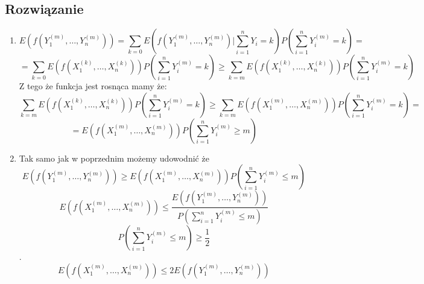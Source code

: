 \subsection*{Rozwiązanie}
\begin{enumerate}[label=(\roman*)]
	\item
	      \[E\left(f\left(Y_{1}^{(m)},\dots,Y_{n}^{(m)}\right)\right) = \sum_{k=0}E\left(f\left(Y_{1}^{(m)},\dots,Y_{n}^{(m)}\right)|\sum_{i=1}^{n}Y_{i}=k\right)P\left(\sum_{i=1}^{n}Y_{i}^{(m)}=k\right) =\]
	      \[= \sum_{k=0}E\left(f\left(X_{1}^{(k)},\dots,X_{n}^{(k)}\right)\right)P\left(\sum_{i=1}^{n}Y_{i}^{(m)}=k\right) \geqslant \sum_{k=m}E\left(f\left(X_{1}^{(k)},\dots,X_{n}^{(k)}\right)\right)P\left(\sum_{i=1}^{n}Y_{i}^{(m)}=k\right)\]
	      Z tego że funkcja jest rosnąca mamy że:
	      \[\sum_{k=m}E\left(f\left(X_{1}^{(k)},\dots,X_{n}^{(k)}\right)\right)P\left(\sum_{i=1}^{n}Y_{i}^{(m)}=k\right) \geqslant \sum_{k=m}E\left(f\left(X_{1}^{(m)},\dots,X_{n}^{(m)}\right)\right)P\left(\sum_{i=1}^{n}Y_{i}^{(m)}=k\right) = \]
	      \[ = E\left(f\left(X_{1}^{(m)},\dots,X_{n}^{(m)}\right)\right)P\left(\sum_{i=1}^{n}Y_{i}^{(m)}\geqslant m\right)\]
	\item Tak samo jak w poprzednim możemy udowodnić że
	      \[E\left(f\left(Y_{1}^{(m)},\dots,Y_{n}^{(m)}\right)\right) \geqslant E\left(f\left(X_{1}^{(m)},\dots,X_{n}^{(m)}\right)\right)P\left(\sum_{i=1}^{n}Y_{i}^{(m)}\leqslant m\right)\]
	      \[E\left(f\left(X_{1}^{(m)},\dots,X_{n}^{(m)}\right)\right) \leqslant \frac{E\left(f\left(Y_{1}^{(m)},\dots,Y_{n}^{(m)}\right)\right)}{P\left(\sum_{i=1}^{n}Y_{i}^{(m)}\leqslant m\right)}\]
	      \[P\left(\sum_{i=1}^{n}Y_{i}^{(m)}\leqslant m\right) \geqslant \frac{1}{2}\].
	      \[E\left(f\left(X_{1}^{(m)},\dots,X_{n}^{(m)}\right)\right) \leqslant 2E\left(f\left(Y_{1}^{(m)},\dots,Y_{n}^{(m)}\right)\right)\]
\end{enumerate}